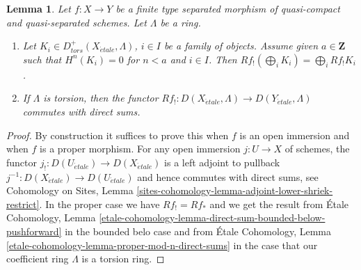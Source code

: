 \documentclass{stacks-project}
\theoremstyle{plain}
\newtheorem{lemma}[subsection]{Lemma}
\theoremstyle{definition}
\theoremstyle{remark}
\numberwithin{equation}{subsection}
\def\etale{{\acute{e}tale}}
\begin{document}
\begin{lemma}
\label{lemma-derived-lower-shriek-commute-direct-sums}
Let $f : X \to Y$ be a finite type separated morphism of quasi-compact
and quasi-separated schemes. Let $\Lambda$ be a ring.
\begin{enumerate}
\item Let $K_i \in D^+_{tors}(X_\etale, \Lambda)$, $i \in I$ be a family
of objects. Assume given $a \in \mathbf{Z}$ such that
$H^n(K_i) = 0$ for $n < a$ and $i \in I$. Then $Rf_!(\bigoplus_i K_i) =
\bigoplus_i Rf_!K_i$.
\item If $\Lambda$ is torsion, then the functor
$Rf_! : D(X_\etale, \Lambda) \to D(Y_\etale, \Lambda)$
commutes with direct sums.
\end{enumerate}
\end{lemma}

\begin{proof}
By construction it suffices to prove this when $f$ is an open immersion
and when $f$ is a proper morphism. For any open immersion $j : U \to X$
of schemes, the functor $j_! : D(U_\etale) \to D(X_\etale)$ is a left
adjoint to pullback $j^{-1} : D(X_\etale) \to D(U_\etale)$
and hence commutes with direct sums, see Cohomology on Sites, Lemma
\ref{sites-cohomology-lemma-adjoint-lower-shriek-restrict}.
In the proper case we have $Rf_! = Rf_*$ and we get the result from
\'Etale Cohomology, Lemma
\ref{etale-cohomology-lemma-direct-sum-bounded-below-pushforward}
in the bounded belo case and from
\'Etale Cohomology, Lemma \ref{etale-cohomology-lemma-proper-mod-n-direct-sums}
in the case that our coefficient ring $\Lambda$ is a torsion ring.
\end{proof}
\end{document}
